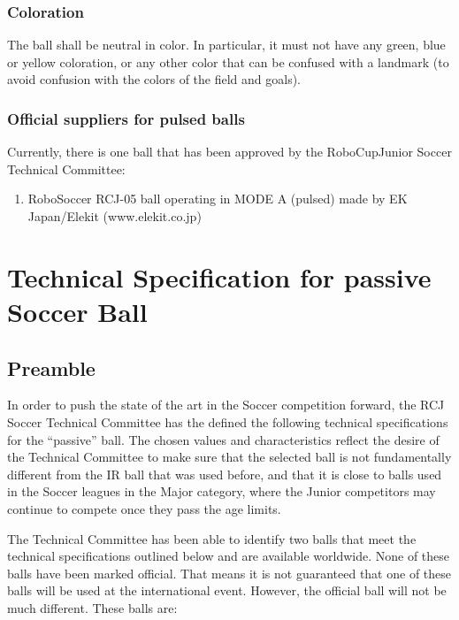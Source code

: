 \documentclass{article}
\begin{document}
\subsubsection{Coloration}

The ball shall be neutral in color. In particular, it must not have any green,
blue or yellow coloration, or any other color that can be confused with a
landmark (to avoid confusion with the colors of the field and goals).

\subsubsection{Official suppliers for pulsed balls}

Currently, there is one ball that has been approved by the RoboCupJunior Soccer
Technical Committee:

\begin{enumerate}
    \item RoboSoccer RCJ-05 ball operating in MODE A (pulsed) made by EK Japan/Elekit (www.elekit.co.jp)
\end{enumerate}

\section{Technical Specification for passive Soccer Ball\label{ref-passive-spec}}

\subsection{Preamble}

In order to push the state of the art in the Soccer competition forward, the
RCJ Soccer Technical Committee has the defined the following technical
specifications for the ``passive'' ball. The chosen values and characteristics
reflect the desire of the Technical Committee to make sure that the selected
ball is not fundamentally different from the IR ball that was used before, and
that it is close to balls used in the Soccer leagues in the Major category,
where the Junior competitors may continue to compete once they pass the age
limits.

The Technical Committee has been able to identify two balls that meet the
technical specifications outlined below and are available worldwide. None of
these balls have been marked official. That means it is not guaranteed that one
of these balls will be used at the international event. However, the official
ball will not be much different. These balls are:
\end{document}
